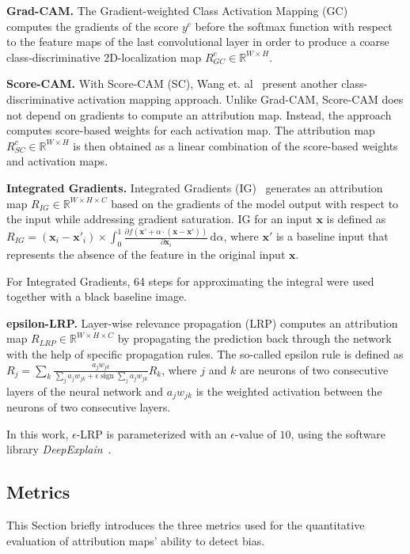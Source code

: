 \documentclass[runningheads]{llncs}
\DeclareMathOperator{\sign}{sign}
\begin{document}
\textbf{Grad-CAM.}
The Gradient-weighted Class Activation Mapping (GC) ~\cite{Selvaraju.2016} computes the gradients of the score $y^c$ before the softmax function with respect to the feature maps of the last convolutional layer in order to produce a coarse class-discriminative 2D-localization map $R_{GC}^c \in \mathbb{R}^{W \times H}$.

\textbf{Score-CAM.}
With Score-CAM (SC), Wang et. al~\cite{Wang.2019} present another class-discriminative activation mapping approach. Unlike Grad-CAM, Score-CAM does not depend on gradients to compute an attribution map. Instead, the approach computes score-based weights for each activation map. The attribution map $R_{SC}^c \in \mathbb{R}^{W \times H}$ is then obtained as a linear combination of the score-based weights and activation maps.

\textbf{Integrated Gradients.}
Integrated Gradients (IG)~\cite{Sundararajan.2017} generates an attribution map $R_{IG} \in \mathbb{R}^{W \times H \times C}$ based on the gradients of the model output with respect to the input while addressing gradient saturation. IG for an input $\mathbf{x}$ is defined as $R_{IG}= (\mathbf{x}_{i}-\mathbf{x}'_{i}) \times \int_{0}^{1} \frac{\partial f(\mathbf{x}'+\alpha \cdot (\mathbf{x}-\mathbf{x}'))}{\partial \mathbf{x}_{i}} \,\mathrm{d}\alpha$, where $\mathbf{x}'$ is a baseline input that represents the absence of the feature in the original input $\mathbf{x}$.

For Integrated Gradients, 64 steps for approximating the integral were used together with a black baseline image.

\textbf{epsilon-LRP.}
Layer-wise relevance propagation (LRP) \cite{Bach.2015} computes an attribution map $R_{LRP} \in \mathbb{R}^{W \times H \times C}$ by propagating the prediction back through the network with the help of specific propagation rules. The so-called epsilon rule is defined as $R_j = \sum_k \frac{a_j w_{jk}}{\sum_j a_j w_{jk} + \epsilon \sign \sum_j a_j w_{jk}}R_k$, where $j$ and $k$ are neurons of two consecutive layers of the neural network and $a_j w_{jk}$ is the weighted activation between the neurons of two consecutive layers.

In this work, $\epsilon$-LRP is parameterized with an $\epsilon$-value of $10$, using the software library \emph{DeepExplain}~\cite{Ancona.2020}.

\subsection{Metrics}\label{metrics}
This Section briefly introduces the three metrics used for the quantitative evaluation of attribution maps' ability to detect bias.
\end{document}
